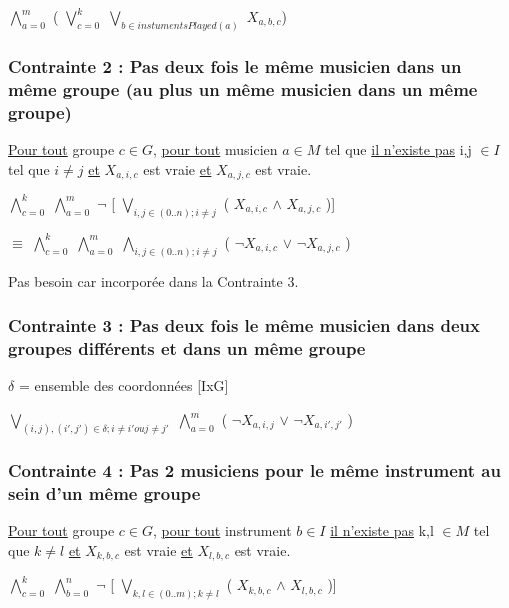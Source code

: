 \documentclass[a4paper,10pt]{report}
\begin{document}
$\bigwedge \limits_{a=0}^{m}$ ( $\bigvee \limits_{c=0}^{k}$ $\bigvee \limits_{b \in instumentsPlayed(a) }$  $X_{a,b,c}$)



\subsubsection{Contrainte 2 : Pas deux fois le même musicien dans un même groupe (au plus un même musicien dans un même groupe)}


\underline{Pour tout} groupe $c \in G$, \underline{pour tout} musicien $a \in M $ tel que \underline{il n'existe pas} i,j $\in I$  tel que $i \neq j$ \underline{et} $X_{a,i,c}$ est vraie
\underline{et} $X_{a,j,c}$ est vraie.


$\bigwedge \limits_{c=0}^{k}$ $\bigwedge \limits_{a=0}^{m}$ $\neg$ [ $\bigvee \limits_{i,j \in (0..n); i\neq j}$ ( $X_{a,i,c}$ $\wedge$ $X_{a,j,c}$ )]


$\equiv$ $\bigwedge \limits_{c=0}^{k}$ $\bigwedge \limits_{a=0}^{m}$  $\bigwedge \limits_{i,j \in (0..n); i\neq j}$ ( $\neg X_{a,i,c}$ $\vee $ $ \neg X_{a,j,c}$ )


Pas besoin car incorporée dans la Contrainte 3.

\subsubsection{Contrainte 3 : Pas deux fois le même musicien dans deux groupes différents et dans un même groupe}

$\delta$ = ensemble des coordonnées [IxG]

 $\bigvee \limits_{(i,j), (i',j') \in \delta ; i\neq i' ou j\neq j'}$ $\bigwedge \limits_{a=0}^{m}$ ( $\neg X_{a,i,j}$ $\vee $ $ \neg X_{a,i',j'}$ )

\subsubsection{Contrainte 4 : Pas 2 musiciens pour le même instrument au sein d'un même groupe}
 
\underline{Pour tout} groupe $c \in G$, \underline{pour tout} instrument $b \in I$ \underline{il n'existe pas} k,l $\in M$  tel que $k \neq l$ \underline{et} $X_{k,b,c}$ est vraie
\underline{et} $X_{l,b,c}$ est vraie. 
 
$\bigwedge \limits_{c=0}^{k}$ $\bigwedge \limits_{b=0}^{n}$ $\neg$ [ $\bigvee \limits_{k,l \in (0..m); k\neq l}$ ( $X_{k,b,c}$ $\wedge$ $X_{l,b,c}$ )]
\end{document}
